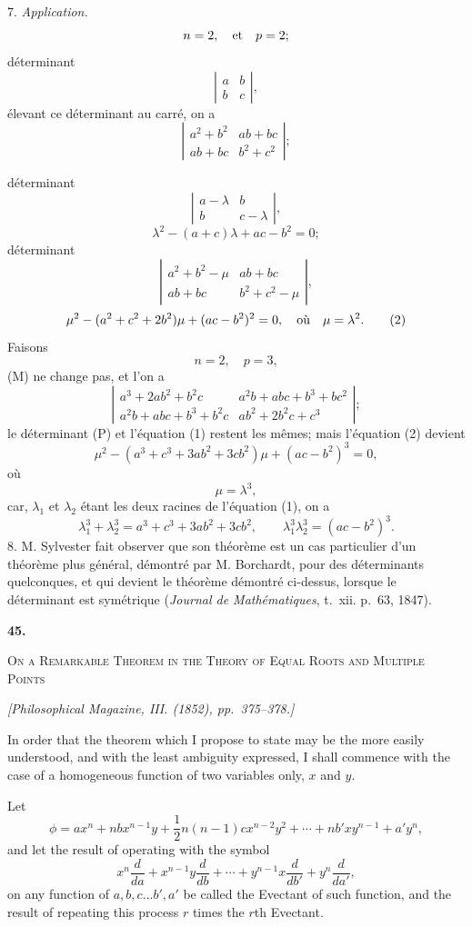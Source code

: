 \documentclass[11pt]{article}
\newcommand{\paperhead}[3]{%
  \clearpage
  \begin{center}
  {\Large\bfseries #1.}\par\vspace{0.85em}
  {\large\scshape #2}\par\vspace{0.6em}
  {\itshape [#3]}\par
  \end{center}\vspace{0.4em}}
\newcommand{\sourcepage}[1]{\marginpar{\scriptsize p.~#1}}
\begin{document}
7. \emph{Application.}
\[
n=2,
\quad\hbox{et}\quad p=2;
\]
déterminant
\[
\left|\begin{array}{cc}a&b\\ b&c\end{array}\right|,
\tag{M}
\]
élevant ce déterminant au carré, on a
\[
\left|\begin{array}{cc}
a^2+b^2&ab+bc\\
ab+bc&b^2+c^2
\end{array}\right|;
\tag{N}
\]

\sourcepage{366}
déterminant
\[
\left|\begin{array}{cc}
a-\lambda&b\\ b&c-\lambda
\end{array}\right|,
\tag{P}
\]
\[
\lambda^2-(a+c)\lambda+ac-b^2=0;
\tag{1}
\]
déterminant
\[
\left|\begin{array}{cc}
a^2+b^2-\mu&ab+bc\\
ab+bc&b^2+c^2-\mu
\end{array}\right|,
\]
\[
\mu^2-(a^2+c^2+2b^2)\mu+(ac-b^2)^2=0,
\quad\hbox{où}\quad \mu=\lambda^2.
\tag{2}
\]
Faisons
\[
n=2,
\quad p=3,
\]
(M) ne change pas, et l'on a
\[
\left|\begin{array}{cc}
a^3+2ab^2+b^2c&a^2b+abc+b^3+bc^2\\
a^2b+abc+b^3+b^2c&ab^2+2b^2c+c^3
\end{array}\right|;
\tag{N}
\]
le déterminant (P) et l'équation (1) restent les mêmes; mais l'équation (2) devient
\[
\mu^2-(a^3+c^3+3ab^2+3cb^2)\mu+(ac-b^2)^3=0,
\]
où
\[
\mu=\lambda^3,
\]
car, $\lambda_1$ et $\lambda_2$ étant les deux racines de l'équation (1), on a
\[
\lambda_1^3+\lambda_2^3=a^3+c^3+3ab^2+3cb^2,
\qquad
\lambda_1^3\lambda_2^3=(ac-b^2)^3.
\]
8. M. Sylvester fait observer que son théorème est un cas particulier d'un théorème plus général, démontré par M. Borchardt, pour des déterminants quelconques, et qui devient le théorème démontré ci-dessus, lorsque le déterminant est symétrique (\emph{Journal de Mathématiques}, t.~xii. p.~63, 1847).

\paperhead{45}{On a Remarkable Theorem in the Theory of Equal Roots and Multiple Points}{Philosophical Magazine, III. (1852), pp.~375--378.}

\sourcepage{367}
In order that the theorem which I propose to state may be the more easily understood, and with the least ambiguity expressed, I shall commence with the case of a homogeneous function of two variables only, $x$ and $y$.

Let
\[
\phi=ax^n+nbx^{n-1}y+\frac12n(n-1)cx^{n-2}y^2+\cdots+nb'xy^{n-1}+a'y^n,
\]
and let the result of operating with the symbol
\[
x^n\frac{d}{da}+x^{n-1}y\frac{d}{db}+\cdots+y^{n-1}x\frac{d}{db'}+y^n\frac{d}{da'},
\]
on any function of $a,b,c\ldots b',a'$ be called the Evectant of such function, and the result of repeating this process $r$ times the $r$th Evectant.
\end{document}
